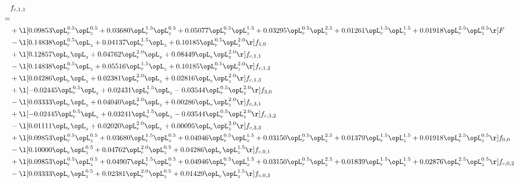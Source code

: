 \begin{alignat}{2} 
\label{eq:f_11_1} 
& f_{c,1,1} \nonumber \\ 
 = \\ 
& + \l[  0.09853 \opL_r^{0.5} \opL_z^{0.5} +  0.03680 \opL_r^{1.5} \opL_z^{0.5} +  0.05077 \opL_r^{0.5} \opL_z^{1.5} +  0.03295 \opL_r^{0.5} \opL_z^{2.5} +  0.01261 \opL_r^{1.5} \opL_z^{1.5} +  0.01918 \opL_r^{2.5} \opL_z^{0.5}  \r] F \nonumber \\ 
& - \l[  0.14838 \opL_r^{0.5} \opL_z +  0.04137 \opL_r^{1.5} \opL_z +  0.10185 \opL_r^{0.5} \opL_z^{2.0}  \r] f_{1,0} \nonumber \\ 
& + \l[  0.12857 \opL_r \opL_z +  0.04762 \opL_r^{2.0} \opL_z +  0.08449 \opL_r \opL_z^{2.0}  \r] f_{c,1,1} \nonumber \\ 
& - \l[  0.14838 \opL_r^{0.5} \opL_z +  0.05516 \opL_r^{1.5} \opL_z +  0.10185 \opL_r^{0.5} \opL_z^{2.0}  \r] f_{c,1,2} \nonumber \\ 
& + \l[  0.04286 \opL_r \opL_z +  0.02381 \opL_r^{2.0} \opL_z +  0.02816 \opL_r \opL_z^{2.0}  \r] f_{c,1,3} \nonumber \\ 
& + \l[  -0.02445 \opL_r^{0.5} \opL_z +  0.02431 \opL_r^{1.5} \opL_z   -0.03544 \opL_r^{0.5} \opL_z^{2.0}  \r] f_{3,0} \nonumber \\ 
& - \l[  0.03333 \opL_r \opL_z +  0.04040 \opL_r^{2.0} \opL_z +  0.00286 \opL_r \opL_z^{2.0}  \r] f_{c,3,1} \nonumber \\ 
& + \l[  -0.02445 \opL_r^{0.5} \opL_z +  0.03241 \opL_r^{1.5} \opL_z   -0.03544 \opL_r^{0.5} \opL_z^{2.0}  \r] f_{c,3,2} \nonumber \\ 
& - \l[  0.01111 \opL_r \opL_z +  0.02020 \opL_r^{2.0} \opL_z +  0.00095 \opL_r \opL_z^{2.0}  \r] f_{c,3,3} \nonumber \\ 
& + \l[  0.09853 \opL_r^{0.5} \opL_z^{0.5} +  0.03680 \opL_r^{1.5} \opL_z^{0.5} +  0.04946 \opL_r^{0.5} \opL_z^{1.5} +  0.03150 \opL_r^{0.5} \opL_z^{2.5} +  0.01379 \opL_r^{1.5} \opL_z^{1.5} +  0.01918 \opL_r^{2.5} \opL_z^{0.5}  \r] f_{0,0} \nonumber \\ 
& - \l[  0.10000 \opL_r \opL_z^{0.5} +  0.04762 \opL_r^{2.0} \opL_z^{0.5} +  0.04286 \opL_r \opL_z^{1.5}  \r] f_{c,0,1} \nonumber \\ 
& + \l[  0.09853 \opL_r^{0.5} \opL_z^{0.5} +  0.04907 \opL_r^{1.5} \opL_z^{0.5} +  0.04946 \opL_r^{0.5} \opL_z^{1.5} +  0.03150 \opL_r^{0.5} \opL_z^{2.5} +  0.01839 \opL_r^{1.5} \opL_z^{1.5} +  0.02876 \opL_r^{2.5} \opL_z^{0.5}  \r] f_{c,0,2} \nonumber \\ 
& - \l[  0.03333 \opL_r \opL_z^{0.5} +  0.02381 \opL_r^{2.0} \opL_z^{0.5} +  0.01429 \opL_r \opL_z^{1.5}  \r] f_{c,0,3} \nonumber \\ 

\end{alignat}
